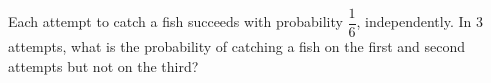 Each attempt to catch a fish succeeds with probability $\dfrac16$, independently. In $3$ attempts, what is the probability of catching a fish on the first and second attempts but not on the third?
